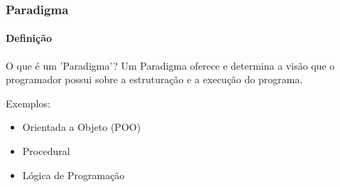 \begin{frame}

    \frametitle{Paradigma}
    \framesubtitle{Definição}

    \begin{block}{O que é um 'Paradigma'?}
      Um Paradigma oferece e determina a visão que o programador possui sobre a estruturação
      e a execução do programa.
     \end{block} \pause 

     Exemplos:

     \begin{itemize}
       \item Orientada a Objeto (POO)
       \item Procedural
       \item Lógica de Programação
     \end{itemize}

\end{frame}